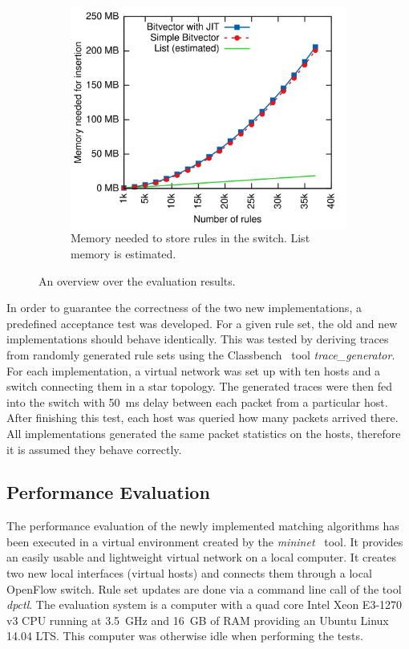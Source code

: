 \documentclass[conference]{IEEEtran}
\begin{document}
\begin{figure}
\begin{subfigure}{.32\linewidth}
        \label{fig:eval-times}
    \end{subfigure}
    ~
    \begin{subfigure}{.32\linewidth}
        \centering
        \includegraphics[width=\textwidth]{images/eval_mem}
        \caption{Memory needed to store rules in the switch. List memory is estimated.}
        \label{fig:eval-mem}
    \end{subfigure}
    \caption{An overview over the evaluation results.}
\end{figure}

In order to guarantee the correctness of the two new implementations, a predefined acceptance test was developed.
For a given rule set, the old and new implementations should behave identically.
This was tested by deriving traces from randomly generated rule sets using 
the Classbench~\cite{classbench_website} tool \textit{trace\_generator}.
For each implementation, a virtual network was set up with ten hosts and a switch connecting them in a star topology.
The generated traces were then fed into the switch with 50\ ms delay between each packet from a particular host.
After finishing this test, each host was queried how many packets arrived there.
All implementations generated the same packet statistics on the hosts, therefore it is assumed they behave correctly.

\subsection{Performance Evaluation}
The performance evaluation of the newly implemented matching algorithms has 
been executed in a virtual environment created by the \textit{mininet}~\cite{mininet} tool.
It provides an easily usable and lightweight virtual network on a local computer.
It creates two new local interfaces (virtual hosts) and connects them through 
a local OpenFlow switch.
Rule set updates are done via a command line call of the tool \textit{dpctl}.
The evaluation system is a computer with a quad core Intel Xeon E3-1270 v3 CPU 
running at 3.5\ GHz and 16\ GB of RAM providing an Ubuntu Linux 14.04 LTS.
This computer was otherwise idle when performing the tests.
\end{document}
